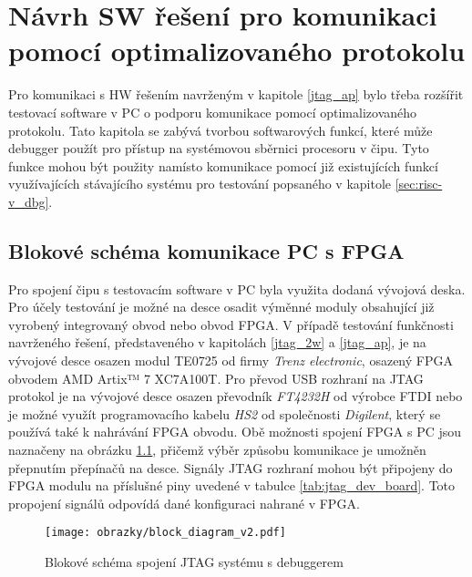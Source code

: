 \chapter{Návrh SW řešení pro komunikaci pomocí optimalizovaného protokolu}	\label{sw}
Pro komunikaci s HW řešením navrženým v kapitole \ref{jtag_ap} bylo třeba rozšířit testovací software v PC o podporu komunikace pomocí optimalizovaného protokolu. Tato kapitola se zabývá tvorbou softwarových funkcí, které může debugger použít pro přístup na systémovou sběrnici procesoru v čipu. Tyto funkce mohou být použity namísto komunikace pomocí již existujících funkcí využívajících stávajícího systému pro testování popsaného v kapitole \ref{sec:risc-v_dbg}.


\section{Blokové schéma komunikace PC s \acs{FPGA}}
Pro spojení čipu s testovacím software v PC byla využita dodaná vývojová deska. Pro účely testování je možné na desce osadit výměnné moduly obsahující již vyrobený integrovaný obvod nebo obvod \acs{FPGA}. V případě testování funkčnosti navrženého řešení, představeného v kapitolách \ref{jtag_2w} a \ref{jtag_ap}, je na vývojové desce osazen modul TE0725 od firmy \textit{Trenz electronic}, osazený FPGA obvodem AMD Artix™ 7 XC7A100T. Pro převod USB rozhraní na \acs{JTAG} protokol je na vývojové desce osazen převodník \textit{FT4232H} od výrobce FTDI nebo je možné využít programovacího kabelu \textit{HS2} od společnosti \textit{Digilent}, který se používá také k nahrávání \acs{FPGA} obvodu. Obě možnosti spojení \acs{FPGA} s PC jsou naznačeny na obrázku \ref{fig:block_diag}, přičemž výběr způsobu komunikace je umožněn přepnutím přepínačů na desce. Signály \acs{JTAG} rozhraní mohou být připojeny do FPGA modulu na příslušné piny uvedené v tabulce \ref{tab:jtag_dev_board}. Toto propojení signálů odpovídá dané konfiguraci nahrané v FPGA.

\begin{figure}[H]
  \begin{center}
    \texttt{[image: obrazky/block\_diagram\_v2.pdf]}
  \end{center}
  \caption{Blokové schéma spojení \acs{JTAG} systému s debuggerem}
	\label{fig:block_diag}
\end{figure}


